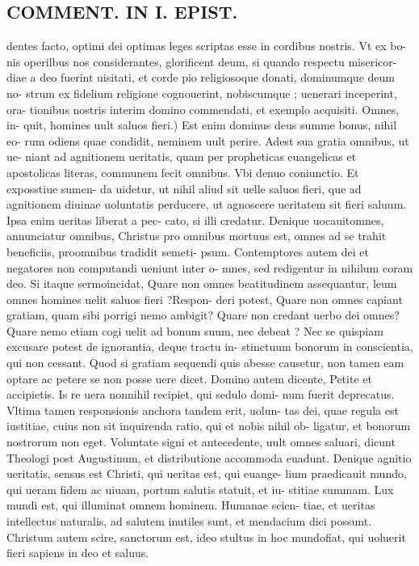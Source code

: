 \documentclass{article}
\begin{document}
\begin{pages}
\section*{COMMENT. IN I. EPIST. }
\marginpar{[ p.482 ]}\pstart dentes facto, optimi dei optimas leges scriptas esse in cordibus nostris. Vt ex bo- nis operilbus nos considerantes, glorificent deum, si quando respectu misericor- diae a deo fuerint uisitati, et corde pio religiosoque donati, dominumque deum no- strum ex fidelium religione cognouerint, nobiscumque ; uenerari inceperint, ora- tionibus nostris interim domino commendati, et exemplo acquisiti. Omnes, in- quit, homines uult saluos fieri.) Est enim dominus deus summe bonus, nihil eo- rum odiens quae condidit, neminem uult perire. Adest sua gratia omnibus, ut ue- niant ad agnitionem ueritatis, quam per propheticas euangelicas et apostolicas literas, communem fecit omnibus. Vbi denuo coniunctio. Et exposstiue sumen- da uidetur, ut nihil aliud sit uelle saluos fieri, que ad agnitionem diuinae uoluntatis perducere, ut agnoscere ueritatem sit fieri saluum. Ipsa enim ueritas liberat a pec- cato, si illi credatur. Denique uocauitomnes, annunciatur omnibus, Christus pro omnibus mortuus est, omnes ad se trahit beneficiis, proomnibus tradidit semeti- psum. Contemptores autem dei et negatores non computandi ueniunt inter o- mnes, sed redigentur in nihilum coram deo. Si itaque sermoincidat, Quare non omnes beatitudinem assequantur, leum omnes homines uelit saluos fieri ?Respon- deri potest, Quare non omnes capiant gratiam, quam sibi porrigi nemo ambigit? Quare non credant uerbo dei omnes? Quare nemo etiam cogi uelit ad bonum suum, nec debeat ? Nec se quispiam excusare potest de ignorantia, deque tractu in- stinctuum bonorum in conscientia, qui non cessant. Quod si gratiam sequendi quis abesse causetur, non tamen eam optare ac petere se non posse uere dicet. Domino autem dicente, Petite et accipietis. Is re uera nonnihil recipiet, qui sedulo domi- num fuerit deprecatus. Vltima tamen responsionis anchora tandem erit, uolun- tas dei, quae regula est iustitiae, cuius non sit inquirenda ratio, qui et nobis nihil ob- ligatur, et bonorum nostrorum non eget. Voluntate signi et antecedente, uult omnes saluari, dicunt Theologi post Augustinum, et distributione accommoda euadunt. Denique agnitio ueritatis, sensus est Christi, qui ueritas est, qui euange- lium praedicauit mundo, qui ueram fidem ac uiuam, portum salutis statuit, et iu- stitiae summam. Lux mundi est, qui illuminat omnem hominem. Humanae scien- tiae, et ueritas intellectus naturalis, ad salutem inutiles sunt, et mendacium dici possunt. Christum autem scire, sanctorum est, ideo stultus in hoc mundofiat, qui uoluerit fieri sapiens in deo et saluus.  \pend
{}
{}

\end{pages}
\end{document}
